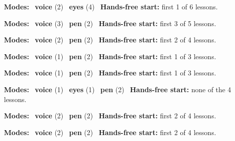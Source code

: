 \expandafter\def\csname hlchaptermodality5\endcsname{%
  {\small\noindent
    \textbf{Modes:} \hlvoicesign{}~\textbf{voice} (2) \quad \hlsightsign{}~\textbf{eyes} (4)\quad
    \hlvoicesign{}~\textbf{Hands-free start:} first 1 of 6 lessons.%
    \par}\medskip
}

\expandafter\def\csname hlchaptermodality6\endcsname{%
  {\small\noindent
    \textbf{Modes:} \hlvoicesign{}~\textbf{voice} (3) \quad \hlpensign{}~\textbf{pen} (2)\quad
    \hlvoicesign{}~\textbf{Hands-free start:} first 3 of 5 lessons.%
    \par}\medskip
}

\expandafter\def\csname hlchaptermodality7\endcsname{%
  {\small\noindent
    \textbf{Modes:} \hlvoicesign{}~\textbf{voice} (2) \quad \hlpensign{}~\textbf{pen} (2)\quad
    \hlvoicesign{}~\textbf{Hands-free start:} first 2 of 4 lessons.%
    \par}\medskip
}

\expandafter\def\csname hlchaptermodality8\endcsname{%
  {\small\noindent
    \textbf{Modes:} \hlvoicesign{}~\textbf{voice} (1) \quad \hlpensign{}~\textbf{pen} (2)\quad
    \hlvoicesign{}~\textbf{Hands-free start:} first 1 of 3 lessons.%
    \par}\medskip
}

\expandafter\def\csname hlchaptermodality9\endcsname{%
  {\small\noindent
    \textbf{Modes:} \hlvoicesign{}~\textbf{voice} (1) \quad \hlpensign{}~\textbf{pen} (2)\quad
    \hlvoicesign{}~\textbf{Hands-free start:} first 1 of 3 lessons.%
    \par}\medskip
}

\expandafter\def\csname hlchaptermodality10\endcsname{%
  {\small\noindent
    \textbf{Modes:} \hlvoicesign{}~\textbf{voice} (1) \quad \hlsightsign{}~\textbf{eyes} (1) \quad \hlpensign{}~\textbf{pen} (2)\quad
    \hlvoicesign{}~\textbf{Hands-free start:} none of the 4 lessons.%
    \par}\medskip
}

\expandafter\def\csname hlchaptermodality11\endcsname{%
  {\small\noindent
    \textbf{Modes:} \hlvoicesign{}~\textbf{voice} (2) \quad \hlpensign{}~\textbf{pen} (2)\quad
    \hlvoicesign{}~\textbf{Hands-free start:} first 2 of 4 lessons.%
    \par}\medskip
}

\expandafter\def\csname hlchaptermodality12\endcsname{%
  {\small\noindent
    \textbf{Modes:} \hlvoicesign{}~\textbf{voice} (2) \quad \hlpensign{}~\textbf{pen} (2)\quad
    \hlvoicesign{}~\textbf{Hands-free start:} first 2 of 4 lessons.%
    \par}\medskip
}

